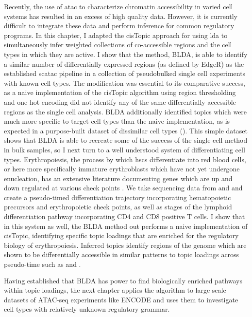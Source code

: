 Recently, the use of \gls{atac} to characterize chromatin accessibility in varied cell systems has resulted in an excess of high quality data. However, it is currently difficult to integrate these data and perform inference for common regulatory programs. In this chapter, I adapted the cisTopic approach for using \gls{lda} to simultaneously infer weighted collections of co-accessible regions and the cell types in which they are active. I show that the method, BLDA, is able to identify a similar number of differentially expressed regions (as defined by EdgeR) as the established \gls{scatac} pipeline in a collection of pseudobulked single cell experiments with known cell types. The modification was essential to its comparative success, as a naive implementation of the cisTopic algorithm using region thresholding and one-hot encoding did not identify any of the same differentially accessible regions as the single cell analysis. BLDA additionally identified topics which were much more specific to target cell types than the naive implementation, as is expected in a purpose-built dataset of dissimilar cell types (). This simple dataset shows that BLDA is able to recreate some of the success of the single cell method in bulk samples, so I next turn to a well understood system of differentiating cell types. Erythropoiesis, the process by which \glspl{hsc} differentiate into red blood cells, or here more specifically immature erythroblasts which have not yet undergone enucleation, has an extensive literature documenting genes which are up and down regulated at various check points \cite{Ludwig2019}. We take sequencing data from \textcite{Ludwig2019} and \textcite{Corces2016} and create a pseudo-timed differentiation trajectory incorporating hematopoietic precursors and erythropoietic check points, as well as stages of the lymphoid differentiation pathway incorporating CD4 and CD8 positive T cells. I show that in this system as well, the BLDA method out performs a naive implementation of cisTopic, identifying specific topic loadings that are enriched for the regulatory biology of erythropoiesis. Inferred topics identify regions of the genome which are shown to be differentially accessible in similar patterns to topic loadings across pseudo-time such as  and . 

Having established that BLDA has power to find biologically enriched pathways within topic loadings, the next chapter applies the algorithm to large scale datasets of ATAC-seq experiments like ENCODE and uses them to investigate cell types with relatively unknown regulatory grammar.  

